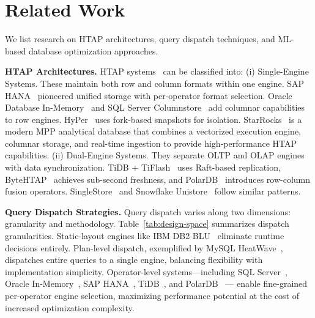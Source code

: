 \documentclass[sigconf, nonacm]{acmart}
\begin{document}
\section{Related Work}\label{sec:related}
We list research on HTAP architectures, query dispatch techniques, and ML-based database optimization approaches.

\noindent\textbf{HTAP Architectures.}
HTAP systems~\cite{zhang2024htap,song2023rethink} can be classified into:
(i) Single-Engine Systems. 
        These maintain both row and column formats within one engine.
        SAP HANA~\cite{farber2012sap_data_eng_bull} pioneered unified storage with per-operator format selection.
        Oracle Database In-Memory~\cite{lahiri2015oracle} and SQL Server Columnstore~\cite{larson2015real,dziedzic2018columnstore} 
        add columnar capabilities to row engines.
        HyPer~\cite{kemper2011hyper} uses fork-based snapshots for isolation.
        StarRocks~\cite{starrocks2025} is a modern MPP analytical database that combines a vectorized execution engine, columnar storage, and real-time ingestion to provide high-performance HTAP capabilities.
(ii) Dual-Engine Systems.
        They separate OLTP and OLAP engines with data synchronization.
        TiDB + TiFlash~\cite{huang2020tidb} uses Raft-based replication,
        ByteHTAP~\cite{chen2022bytehtap} achieves sub-second freshness,
        and PolarDB~\cite{wang2023polardb} introduces row-column fusion operators.
        SingleStore~\cite{prout2022cloud} and Snowflake Unistore~\cite{sun2023unistore} follow similar patterns.


\noindent\textbf{Query Dispatch Strategies.}
Query dispatch varies along two dimensions: granularity and methodology. Table~\ref{tab:design-space} summarizes dispatch granularities.
Static-layout engines like IBM DB2 BLU~\cite{raman2013db2} eliminate runtime decisions entirely. Plan-level dispatch, exemplified by MySQL HeatWave~\cite{oracle2025heatwave}, dispatches entire queries to a single engine, balancing flexibility with implementation simplicity. Operator-level systems—including SQL Server~\cite{larson2015real}, Oracle In-Memory~\cite{lahiri2015oracle}, SAP HANA~\cite{krueger2010optimizing}, TiDB~\cite{huang2020tidb}, and PolarDB~\cite{wang2023polardb} — enable fine-grained per-operator engine selection, maximizing performance potential at the cost of increased optimization complexity.
\end{document}
